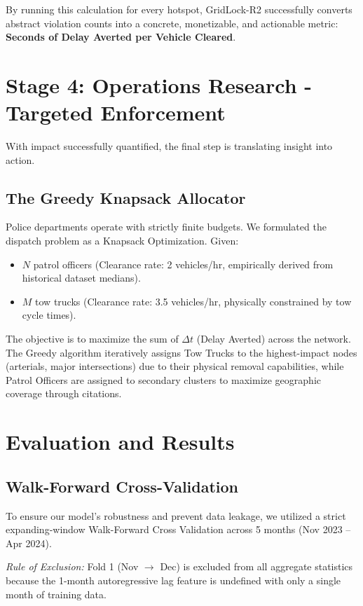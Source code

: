 \documentclass[12pt,a4paper]{article}
\begin{document}
By running this calculation for every hotspot, GridLock-R2 successfully converts abstract violation counts into a concrete, monetizable, and actionable metric: \textbf{Seconds of Delay Averted per Vehicle Cleared}.

\section{Stage 4: Operations Research - Targeted Enforcement}

With impact successfully quantified, the final step is translating insight into action. 

\subsection{The Greedy Knapsack Allocator}
Police departments operate with strictly finite budgets. We formulated the dispatch problem as a Knapsack Optimization. 
Given:
\begin{itemize}
    \item $N$ patrol officers (Clearance rate: 2 vehicles/hr, empirically derived from historical dataset medians).
    \item $M$ tow trucks (Clearance rate: 3.5 vehicles/hr, physically constrained by tow cycle times).
\end{itemize}

The objective is to maximize the sum of $\Delta t$ (Delay Averted) across the network. The Greedy algorithm iteratively assigns Tow Trucks to the highest-impact nodes (arterials, major intersections) due to their physical removal capabilities, while Patrol Officers are assigned to secondary clusters to maximize geographic coverage through citations.

\section{Evaluation and Results}

\subsection{Walk-Forward Cross-Validation}
To ensure our model's robustness and prevent data leakage, we utilized a strict expanding-window Walk-Forward Cross Validation across 5 months (Nov 2023 – Apr 2024). 

\textit{Rule of Exclusion:} Fold 1 (Nov $\rightarrow$ Dec) is excluded from all aggregate statistics because the 1-month autoregressive lag feature is undefined with only a single month of training data. 
\end{document}
